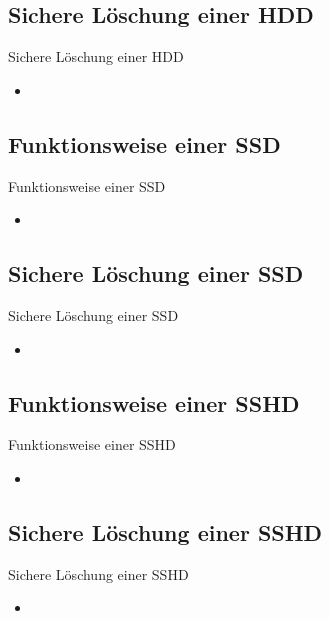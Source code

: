 \documentclass{beamer}
\begin{document}
\subsection{Sichere Löschung einer HDD}
\begin{frame}{Sichere Löschung einer HDD}
	\begin{itemize}
		\item 
	\end{itemize}
\end{frame}

\subsection{Funktionsweise einer SSD}
\begin{frame}{Funktionsweise einer SSD}
	\begin{itemize}
		\item 
	\end{itemize}
\end{frame}

\subsection{Sichere Löschung einer SSD}
\begin{frame}{Sichere Löschung einer SSD}
	\begin{itemize}
		\item 
	\end{itemize}
\end{frame}

\subsection{Funktionsweise einer SSHD}
\begin{frame}{Funktionsweise einer SSHD}
	\begin{itemize}
		\item 
	\end{itemize}
\end{frame}

\subsection{Sichere Löschung einer SSHD}
\begin{frame}{Sichere Löschung einer SSHD}
	\begin{itemize}
		\item 
	\end{itemize}
\end{frame}

\end{document}
